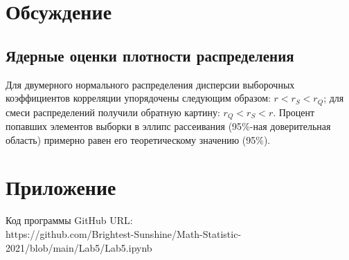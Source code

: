 \documentclass{article}
\begin{document}
\section{Обсуждение}
\subsection{Ядерные оценки плотности распределения}
\noindent Для двумерного нормального распределения дисперсии выборочных коэффициентов корреляции упорядочены следующим образом: $r < r_{S} < r_{Q}$; для смеси распределений получили обратную картину: $r_{Q} < r_{S} < r$.
\newline
\noindent Процент попавших элементов выборки в эллипс рассеивания (95$\%$-ная доверительная область) примерно равен его теоретическому значению (95$\%$).

\section{Приложение}
\noindent Код программы GitHub URL:\\
\newline https://github.com/Brightest-Sunshine/Math-Statistic-2021/blob/main/Lab5/Lab5.ipynb
\end{document}

